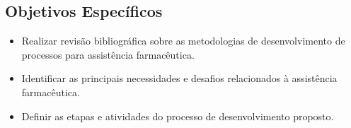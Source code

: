 \subsection{Objetivos Específicos}
\begin{itemize}

\item Realizar revisão bibliográfica sobre as metodologias de desenvolvimento de processos para assistência farmacêutica.
\item Identificar as principais necessidades e desafios relacionados à assistência farmacêutica.
\item Definir as etapas e atividades do processo de desenvolvimento proposto.

\end{itemize}
